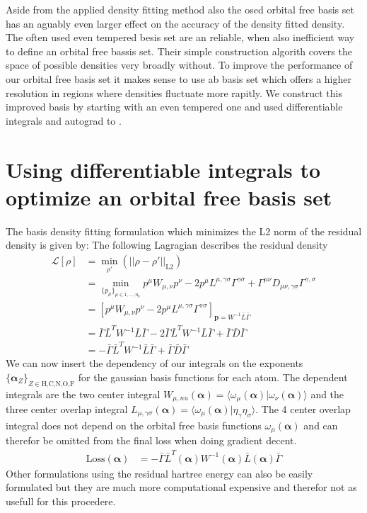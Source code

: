 Aside from the applied density fitting method also the osed orbital free basis set has an aguably even larger effect on the accuracy of the density fitted density.
The often used even tempered besis set are an reliable, when also inefficient way to define an orbital free bassis set. Their simple construction algorith\cite{cosnt} covers the space of possible densities very broadly without.
To improve the performance of our orbital free basis set it makes sense to use ab basis set which offers a higher  resolution in regions where densities fluctuate more rapitly.
We construct this improved basis by starting with an even tempered one and used differentiable integrals and autograd to .

\section{Using differentiable integrals to optimize an orbital free basis set}
The basis density fitting formulation which minimizes the L2 norm of the residual density is given by:
The following Lagragian describes the residual density
\begin{align}
    \mathcal{L}[\rho] &= \min_{\rho'}\left(||\rho-\rho'||_{\text{L2}}\right)\\
    & = \min_{\{p_{\mu}\}_{\mu \in 1,...,n_b}} p^\mu W_{\mu,\nu} p^\nu - 2 p^\mu L^{\mu,\gamma\sigma} \Gamma^{\gamma\sigma} + \Gamma^{\mu\nu} D_{\mu\nu,\gamma\sigma} \Gamma^{\gamma,\sigma}\\
    & = \left[p^\mu W_{\mu,\nu} p^\nu - 2 p^\mu L^{\mu,\gamma\sigma} \Gamma^{\gamma\sigma}\right]_{\mathbf{p} = W^{-1}\bar{L}\bar\Gamma}\\
    & = \bar \Gamma \bar L ^T W^{-1} \bar L \bar \Gamma - 2 \bar \Gamma \bar L^T W^{-1} \bar L \bar \Gamma + \bar \Gamma \bar D \bar \Gamma\\
    & = - \bar \Gamma \bar L^T W^{-1} \bar L \bar \Gamma + \bar \Gamma \bar D \bar \Gamma
\end{align}
We can now insert the dependency of our integrals on the exponents $\{\mathbf{\alpha}_Z\}_{Z\in \text{H,C,N,O,F}}$ for the gaussian basis functions for each atom.
The dependent integrals are the two center integral $W_{\mu,nu}(\mathbf{\alpha}) = \langle \omega_\mu(\mathbf{\alpha})|\omega_\nu(\mathbf{\alpha})\rangle$
 and the three center overlap integral $L_{\mu,\gamma\sigma}(\mathbf{\alpha}) = \langle \omega_\mu(\mathbf{\alpha})|\eta_\gamma\eta_\sigma\rangle$. The 4 center overlap integral does not depend on the orbital free basis functions $\omega_\mu(\mathbf{\alpha})$ and can therefor be omitted from the final loss when doing gradient decent.
 \begin{align}\label{loss_basis_set_fitting}
    \text{Loss}(\mathbf{\alpha}) & = - \bar \Gamma \bar L^T(\mathbf{\alpha}) W^{-1}(\mathbf{\alpha}) \bar L(\mathbf{\alpha}) \bar \Gamma
 \end{align}
 Other formulations using the residual hartree energy can also be easily formulated but they are much more computational expensive and therefor not as usefull for this procedere.
